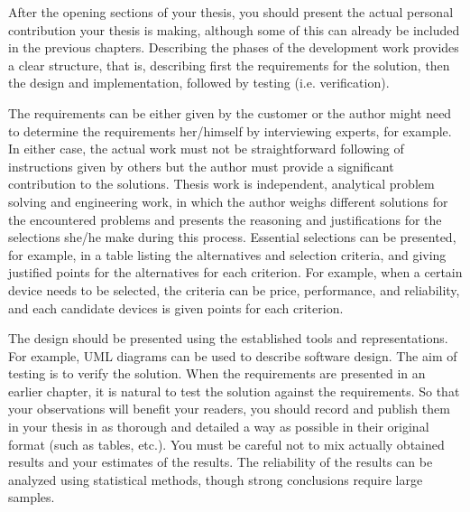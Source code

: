 After the opening sections of your thesis, you should present the actual personal contribution your thesis is making, although some of this can already be included in the previous chapters. Describing the phases of the development work provides a clear structure, that is, describing first the requirements for the solution, then the design and implementation, followed by testing (i.e. verification).

The requirements can be either given by the customer or the author might need to determine the requirements her/himself by interviewing experts, for example. In either case, the actual work must not be straightforward following of instructions given by others but the author must provide a significant contribution to the solutions. Thesis work is independent, analytical problem solving and engineering work, in which the author weighs different solutions for the encountered problems and presents the reasoning and justifications for the selections she/he make during this process. Essential selections can be presented, for example, in a table listing the alternatives and selection criteria, and giving justified points for the alternatives for each criterion. For example, when a certain device needs to be selected, the criteria can be price, performance, and reliability, and each candidate devices is given points for each criterion.

The design should be presented using the established tools and representations. For example, UML diagrams can be used to describe software design. The aim of testing is to verify the solution. When the requirements are presented in an earlier chapter, it is natural to test the solution against the requirements. So that your observations will benefit your readers, you should record and publish them in your thesis in as thorough and detailed a way as possible in their original format (such as tables, etc.). You must be careful not to mix actually obtained results and your estimates of the results. The reliability of the results can be analyzed using statistical methods, though strong conclusions require large samples.

